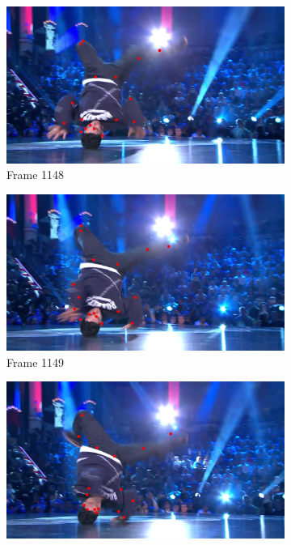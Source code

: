 \documentclass[./main.tex]{subfiles}
\begin{document}
\begin{figure}[htbp]
    \centering
    \begin{subfigure}{0.45\textwidth}
        \centering
        \includegraphics[width=\textwidth]{entities/BRACE_1148.png}
        \caption{Frame 1148}
    \end{subfigure}
    \begin{subfigure}{0.45\textwidth}
        \centering
        \includegraphics[width=\textwidth]{entities/BRACE_1149.png}
        \caption{Frame 1149}
    \end{subfigure}
    \begin{subfigure}{0.45\textwidth}
        \centering
        \includegraphics[width=\textwidth]{entities/BRACE_1150.png}

\end{subfigure}
\end{figure}
\end{document}
